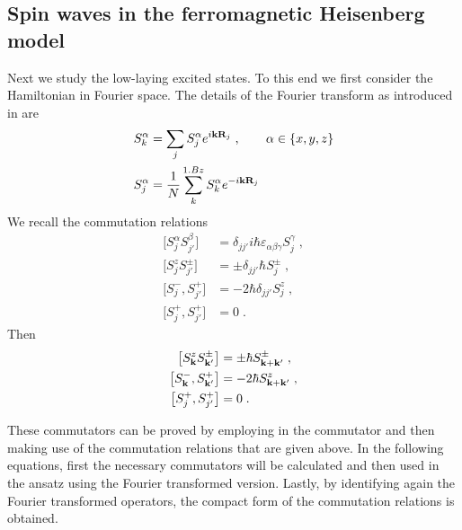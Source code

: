 \subsection{Spin waves in the ferromagnetic Heisenberg model}
%
Next we study the low-laying excited states. To this end we 
first consider the  Hamiltonian in  Fourier space. 
The details of the 
Fourier transform as introduced in  are
\begin{subequations}\label{eq:FT:magnetism2}
\begin{align}
S_{k}^{\alpha} &= \sum_{j} S_{j}^{\alpha} e^{i \mathbf k \mathbf R_{j}}\;,\qquad \alpha\in\{x,y,z\}\\
S_{j}^{\alpha}&=\frac{1}{N} \sum_{k}^{1.Bz} S_{k}^{\alpha} e^{-i \mathbf k \mathbf R_{j}}
\end{align}
\end{subequations}
%
We recall the commutation relations 
%
\begin{subequations}\label{eq:}
\begin{align}
\big[ S_{j}^{\alpha}S_{j'}^{\beta}	 \big] &= \delta_{jj'}
i \hbar \varepsilon_{\alpha\beta\gamma}S_{j}^{\gamma}\;,\\
\big[S_{j}^{z} S^{\pm}_{j'}\big] &=\pm \delta_{jj'} \hbar S^{\pm}_{j}\;,\\
\big[S^{-}_{j},S^{+}_{j'}\big] 
&= -2 \hbar \delta_{jj'} S^{z}_{j}\;,\\
\big[S^{+}_{j},S^{+}_{j'}\big]  &= 0\;.
\end{align}
\end{subequations}
Then
%
\begin{subequations}\label{eq:}
\begin{align}
\big[S_{\mathbf k}^{z} S^{\pm}_{\mathbf k'}\big] 
&=\pm  \hbar S^{\pm}_{\mathbf k+\mathbf k'}\;,\\
\big[S^{-}_{\mathbf k},S^{+}_{\mathbf k'}\big] 
&= -2 \hbar S^{z}_{\mathbf k +\mathbf k'}\;,\\
\big[S^{+}_{j},S^{+}_{j'}\big]  &= 0\;.
\end{align}
\end{subequations}

These commutators can be proved by employing  in the commutator and then making use of the commutation relations that are given above. In the following equations, first the necessary commutators will be calculated and then used in the ansatz using the Fourier transformed version. Lastly, by identifying again the Fourier transformed operators, the compact form of the commutation relations is obtained.

